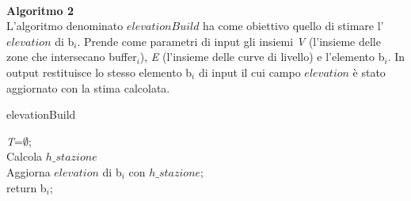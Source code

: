 \mbox{}\\
\newline
\newline
\textbf{Algoritmo 2}\\
\newline
L'algoritmo denominato $elevationBuild$ ha come obiettivo quello di stimare l'$elevation$ di b$_i$. Prende come parametri di input gli insiemi \textit{V} (l'insieme delle zone che intersecano buffer$_i$), \textit{E} (l'insieme delle curve di livello) e l'elemento b$_i$. In output restituisce lo stesso elemento b$_i$ di input il cui campo $elevation$ è stato aggiornato con la stima calcolata.\\ 

\begin{algorithm}[H]
	

	\IncMargin{1em}
	\caption{elevationBuild}
	\label{alg:due}
	\BlankLine
	
	\SetAlgoNoLine
	
    \textit{T}=$\emptyset$; \\
    Calcola $h\_stazione$ \\
    Aggiorna $elevation$ di b$_i$ con $h\_stazione$;\\
	return b$_{i}$; \\
	

\end{algorithm}

